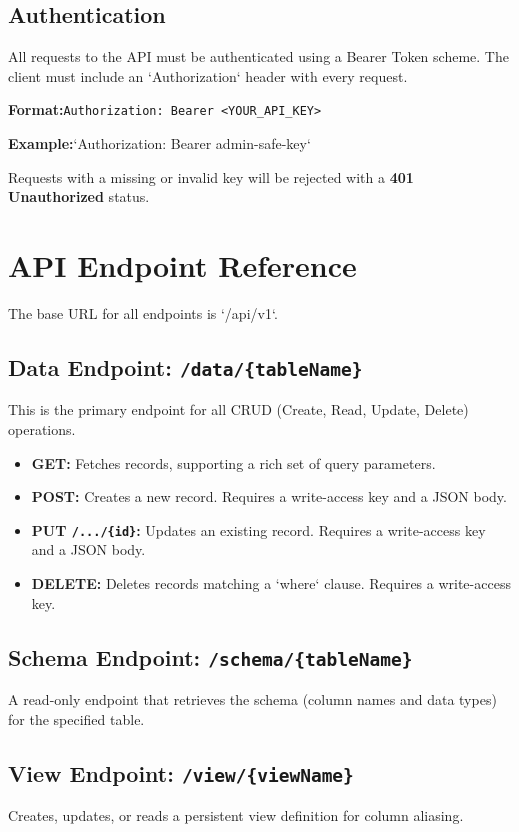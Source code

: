 \documentclass[12pt, a4paper]{report}
\begin{document}
\subsection{Authentication}
All requests to the API must be authenticated using a Bearer Token scheme. The client must include an `Authorization` header with every request.

\textbf{Format:}\lstinline|Authorization: Bearer <YOUR_API_KEY>|

\textbf{Example:}`Authorization: Bearer admin-safe-key`

Requests with a missing or invalid key will be rejected with a \textbf{401 Unauthorized} status.

\section{API Endpoint Reference}
The base URL for all endpoints is `/api/v1`.

\subsection{Data Endpoint: \texttt{/data/\{tableName\}}}
This is the primary endpoint for all CRUD (Create, Read, Update, Delete) operations.
\begin{itemize}
    \item \textbf{GET:} Fetches records, supporting a rich set of query parameters.
    \item \textbf{POST:} Creates a new record. Requires a write-access key and a JSON body.
    \item \textbf{PUT \texttt{/.../\{id\}}:} Updates an existing record. Requires a write-access key and a JSON body.
    \item \textbf{DELETE:} Deletes records matching a `where` clause. Requires a write-access key.
\end{itemize}

\subsection{Schema Endpoint: \texttt{/schema/\{tableName\}}}
A read-only endpoint that retrieves the schema (column names and data types) for the specified table.

\subsection{View Endpoint: \texttt{/view/\{viewName\}}}
Creates, updates, or reads a persistent view definition for column aliasing.
\end{document}

